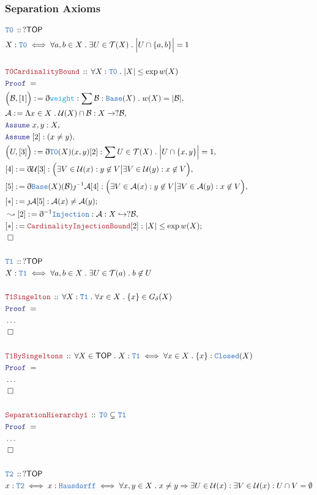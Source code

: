 \documentclass[12pt]{scrartcl}
\newcommand{\TYPE}[1]{\textcolor{NavyBlue}{\mathtt{#1}}}
\newcommand{\FUNC}[1]{\textcolor{Cerulean}{\mathtt{#1}}}
\newcommand{\LOGIC}[1]{\textcolor{Blue}{\mathtt{#1}}}
\newcommand{\THM}[1]{\textcolor{Maroon}{\mathtt{#1}}}
\renewcommand{\.}{\; . \;}
\newcommand{\de}{: \kern 0.1pc =}
\newcommand{\Theorem}[2]{& \THM{#1} \, :: \, #2 \\ & \Proof = \\ }
\newcommand{\DeclareType}[2]{& \TYPE{#1} \, :: \, #2 \\}
\newcommand{\DefineType}[3]{& #1 : \TYPE{#2} \iff #3 \\}
\newcommand{\DefineNamedType}[4]{& #1 : \TYPE{#2} \iff #3 \iff #4 \\}
\newcommand{\Page}[1]{ \begin{align*} #1 \end{align*}   }
\newcommand{ \bd }{ \ByDef }
\newcommand{\NoProof}{ & \ldots \\ \EndProof}
\newcommand{\Imply}{\Rightarrow}
\newcommand{\ToInj}{\hookrightarrow}
\newcommand{\Say}[3]{& #1 \de #2 : #3, \\}
\newcommand{\Conclude}[3]{& #1 \de #2 : #3; \\}
\newcommand{\Derive}[3]{& \leadsto #1 \de #2 : #3, \\}
\newcommand{\Assume}[2]{& \LOGIC{Assume} \; #1 : #2, \\}
\newcommand{\QED}{\; \square}
\newcommand{\EndProof}{& \QED \\}
\newcommand{\ByDef}{\eth}
\newcommand{\ByConstr}{\jmath}
\newcommand{\Proof}{\LOGIC{Proof} \; }
\newcommand{\A}{\mathcal{A}}
\newcommand{\B}{\mathcal{B}}
\newcommand{\TOP}{\mathsf{TOP}}
\newcommand{\T}{\mathcal{T}}
\newcommand{\U}{\mathcal{U}}
\begin{document}
\subsubsection{Separation Axioms}
\Page{
	\DeclareType{T0}{?\TOP}
	\DefineType{X}{T0}
	{
		\forall a,b \in X \. \exists U \in \T(X) \.
		\Big|U \cap \{a, b \}\Big| = 1 
	}
	\\
	\Theorem{T0CardinalityBound}
	{
		\forall X : \TYPE{T0} \.
		|X| \le \exp w(X)
	}
	\Say{\Big(\B,[1]\Big)}
	{
		\bd \FUNC{weight}
	}
	{
		\sum \B : \TYPE{Base}(X) \. w(X) = |\B|
	}
	\Say{\A}{\Lambda x \in X \. \U(X) \cap \B}
	{
		X \to ?\B
	}
	\Assume{x,y}{X}
	\Assume{[2]}{(x \neq y)}
	\Say{\Big(U,[3]\Big)}
	{
		\bd \TYPE{T0}(X)(x,y)[2]
	}
	{
		\sum U \in \T(X) \. \Big|U \cap \{x,y\}\Big| =  1
	}
	\Say{[4]}{\bd \U [3]}
	{
		\Big( \exists V  \in \U(x) : y \not \in V \big|
		\exists V  \in \U(y) : x \not \in V \Big)
	}
	\Say{[5]}{\bd \TYPE{Base}(X)(\B) \ByConstr^{-1} \A [4]}
	{
		\Big( \exists V  \in \A(x) : y \not \in V \big|
		\exists V  \in \A(y) : x \not \in V \Big)
	}
	\Conclude{[*]}{\ByConstr \A [5]}
	{
		\A(x) \neq \A(y)
	}
	\Derive{[2]}{\bd^{-1} \TYPE{Injection}}
	{
		\A : X \ToInj ?\B
	}
	\Conclude{[*]}{\THM{CardinalityInjectionBound}[2]}
	{ 
	  |X| \le  \exp w(X)
	}
	\EndProof
	\\
	\DeclareType{T1}{?\TOP}
	\DefineType{X}{T1}
	{
		\forall a,b \in X \.  \exists U \in \T(a) \.
		b \not \in U 
	}
	\\
	\Theorem{T1Singelton}
	{
		\forall X : \TYPE{T1} \. \forall x \in X \. 
		\{ x \} \in G_\delta(X)
	}
	\NoProof
	\\
	\Theorem{T1BySingeltons}
	{
		\forall X \in \TOP \.
		X : \TYPE{T1} \iff
		\forall x \in X \.
		\{x\} : \TYPE{Closed}(X)
	}
	\NoProof
	\\
	\Theorem{SeparationHierarchy1}
	{
		\TYPE{T0} \subsetneq \TYPE{T1}
	}
	\NoProof
	\\
	\DeclareType{T2}{?\TOP}
	\DefineNamedType{x}{T2}{x : \TYPE{Hausdorff}}
	{
		\forall x,y \in X \.
		x \neq y \Imply 
		\exists U \in \U(x) : 
		\exists V \in \U(x) :
		U \cap V = \emptyset
	}
}
\end{document}
